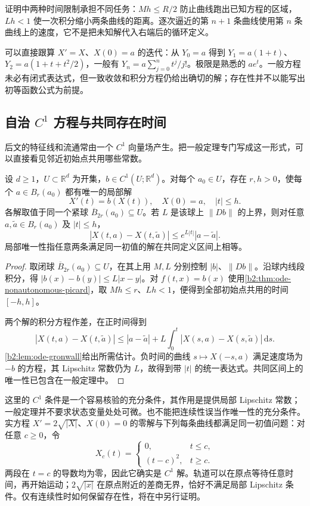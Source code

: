 证明中两种时间限制承担不同任务：\(Mh\leq R/2\) 防止曲线跑出已知方程的区域，\(Lh<1\) 使一次积分缩小两条曲线的距离。逐次逼近的第 \(n+1\) 条曲线使用第 \(n\) 条曲线上的速度，它不是把未知解代入右端后的循环定义。

\ProseParagraphBreak
可以直接跟算 \(X'=X\)、\(X(0)=a\) 的迭代：从 \(Y_0=a\) 得到 \(Y_1=a(1+t)\)、\(Y_2=a(1+t+t^2/2)\)，一般有 \(Y_n=a\sum_{j=0}^n t^j/j!\)。极限是熟悉的 \(ae^t\)。一般方程未必有闭式表达式，但一致收敛和积分方程仍给出确切的解；存在性并不以能写出初等函数公式为前提。

\subsection{自治 \texorpdfstring{\(C^1\)}{C¹} 方程与共同存在时间}
\label{b2:subsec:ode-autonomous-picard}

后文的特征线和流通常由一个 \(C^1\) 向量场产生。把一般定理专门写成这一形式，可以直接看见邻近初始点共用哪些常数。

\begin{theorem}\label{b2:thm:07-local-ode}
设 \(d\geq1\)，\(U\subset\mathbb R^d\) 为开集，\(b\in C^1(U;\mathbb R^d)\)。对每个 \(a_0\in U\)，存在 \(r,h>0\)，使每个 \(a\in B_r(a_0)\) 都有唯一的局部解
\[
 X'(t)=b(X(t)),\quad X(0)=a,\quad |t|\leq h.
\]
各解取值于同一个紧球 \(\overline B_{2r}(a_0)\subseteq U\)。若 \(L\) 是该球上 \(\|Db\|\) 的上界，则对任意 \(a,\widetilde a\in B_r(a_0)\) 及 \(|t|\leq h\)，
\begin{equation}\label{b2:eq:07-flow-lipschitz}
 |X(t,a)-X(t,\widetilde a)|
 \leq e^{L|t|}|a-\widetilde a|.
\end{equation}
局部唯一性指任意两条满足同一初值的解在共同定义区间上相等。
\end{theorem}
\begin{proof}
取闭球 \(\overline B_{2r}(a_0)\subseteq U\)，在其上用 \(M,L\) 分别控制 \(|b|\)、\(\|Db\|\)。沿球内线段积分，得 \(|b(x)-b(y)|\leq L|x-y|\)。对 \(f(t,x)=b(x)\) 使用\cref{b2:thm:ode-nonautonomous-picard}，取 \(Mh\leq r\)、\(Lh<1\)，便得到全部初始点共用的时间 \([-h,h]\)。

两个解的积分方程作差，在正时间得到
\[
 |X(t,a)-X(t,\widetilde a)|
 \leq |a-\widetilde a|
 +L\int_0^t|X(s,a)-X(s,\widetilde a)|\,\mathrm ds.
\]
\cref{b2:lem:ode-gronwall}给出所需估计。负时间的曲线 \(s\mapsto X(-s,a)\) 满足速度场为 \(-b\) 的方程，其 Lipschitz 常数仍为 \(L\)，故得到带 \(|t|\) 的统一表达式。共同区间上的唯一性已包含在一般定理中。
\end{proof}

这里的 \(C^1\) 条件是一个容易核验的充分条件，其作用是提供局部 Lipschitz 常数；一般定理并不要求状态变量处处可微。也不能把连续性误当作唯一性的充分条件。实方程 \(X'=2\sqrt{|X|}\)、\(X(0)=0\) 的零解与下列每条曲线都满足同一初值问题：对任意 \(c\geq0\)，令
\[
 X_c(t)=
 \begin{cases}
 0,&t\leq c,\\
 (t-c)^2,&t\geq c.
 \end{cases}
\]
两段在 \(t=c\) 的导数均为零，因此它确实是 \(C^1\) 解。轨道可以在原点等待任意时间，再开始运动；\(2\sqrt{|x|}\) 在原点附近的差商无界，恰好不满足局部 Lipschitz 条件。仅有连续性时如何保留存在性，将在中另行证明。
